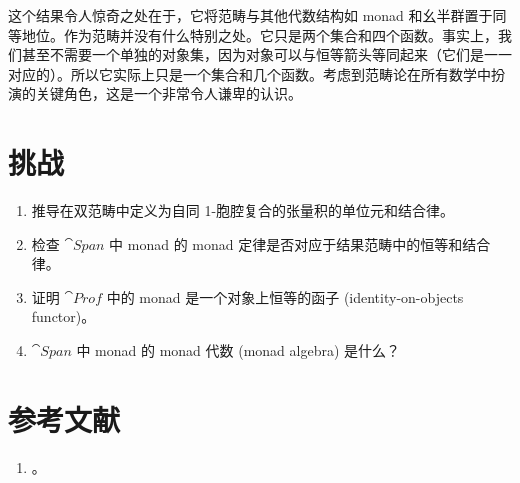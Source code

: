 这个结果令人惊奇之处在于，它将范畴与其他代数结构如 monad 和幺半群置于同等地位。作为范畴并没有什么特别之处。它只是两个集合和四个函数。事实上，我们甚至不需要一个单独的对象集，因为对象可以与恒等箭头等同起来（它们是一一对应的）。所以它实际上只是一个集合和几个函数。考虑到范畴论在所有数学中扮演的关键角色，这是一个非常令人谦卑的认识。

\section{挑战}

\begin{enumerate}
  \tightlist
  \item
        推导在双范畴中定义为自同 1-胞腔复合的张量积的单位元和结合律。
  \item
        检查 $\cat{Span}$ 中 monad 的 monad 定律是否对应于结果范畴中的恒等和结合律。
  \item
        证明 $\cat{Prof}$ 中的 monad 是一个对象上恒等的函子 (identity-on-objects functor)。
  \item
        $\cat{Span}$ 中 monad 的 monad 代数 (monad algebra) 是什么？
\end{enumerate}

\section{参考文献}
\begin{enumerate}
  \tightlist
  \item
        。
\end{enumerate}